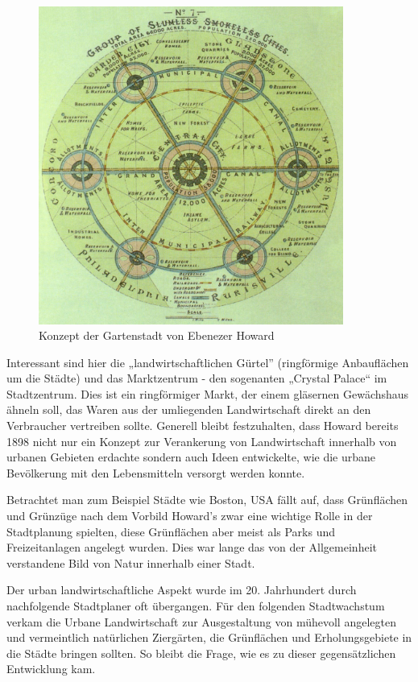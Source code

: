 \documentclass{scrartcl}
\begin{document}
\begin{figure}[htbp]
\centering
\includegraphics[width=10cm]{image_folder/GardenCityConcept_EbenezerHoward.jpg}
\caption{Konzept der Gartenstadt von Ebenezer Howard}
\label{fig:GardenCityConcept_EbenezerHoward}
\end{figure}

Interessant sind hier die „landwirtschaftlichen Gürtel” (ringförmige Anbauflächen um die Städte) und das Marktzentrum - den sogenanten „Crystal Palace“ im Stadtzentrum. Dies ist ein ringförmiger Markt, der einem gläsernen Gewächshaus ähneln soll, das Waren aus der umliegenden Landwirtschaft direkt an den Verbraucher vertreiben sollte. Generell bleibt festzuhalten, dass Howard bereits 1898 nicht nur ein Konzept zur Verankerung von Landwirtschaft innerhalb von urbanen Gebieten erdachte sondern auch Ideen entwickelte, wie die urbane Bevölkerung mit den Lebensmitteln versorgt werden konnte.

Betrachtet man zum Beispiel Städte wie Boston, USA fällt auf, dass Grünflächen und Grünzüge nach dem Vorbild Howard's zwar eine wichtige Rolle in der Stadtplanung spielten, diese Grünflächen aber meist als Parks und Freizeitanlagen angelegt wurden. Dies war lange das von der Allgemeinheit verstandene Bild von Natur innerhalb einer Stadt.

Der urban landwirtschaftliche Aspekt wurde im 20. Jahrhundert durch nachfolgende Stadtplaner oft übergangen. Für den folgenden Stadtwachstum verkam die Urbane Landwirtschaft zur Ausgestaltung von mühevoll angelegten und vermeintlich natürlichen Ziergärten, die Grünflächen und Erholungsgebiete in die Städte bringen sollten. So bleibt die Frage, wie es zu dieser gegensätzlichen Entwicklung kam.
\end{document}
